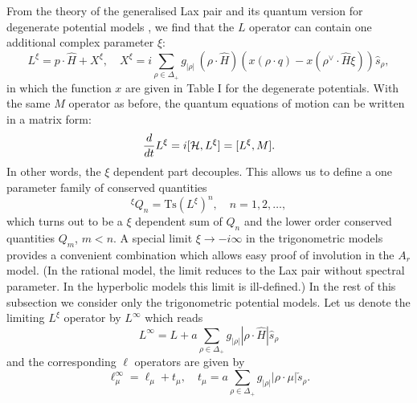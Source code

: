 \documentclass[a4paper,12pt]{article}
\begin{document}
From the theory of the generalised Lax pair \cite{bcs2} and its
quantum version for degenerate potential models \cite{bms}, we
find that the \(L\) operator can contain one additional complex
parameter \(\xi\):
\begin{equation}
   L^{\xi} = p\cdot\hat{H}+X^{\xi},\quad
   X^{\xi}=i\sum_{\rho\in\Delta_{+}}g_{|\rho|}
   \,(\rho\cdot\hat{H})\left(x(\rho\cdot
   q)-x(\rho^\vee\!\cdot\hat{H}\xi)\right)\hat{s}_{\rho},
   \label{LaxOpDefxi}
\end{equation}
in which the function \(x\) are given in Table I for the degenerate
potentials. With the same \(M\) operator as before, the quantum
equations of motion can be written in a matrix form:
\begin{equation}
   \label{LaxEquationxi}
   {d\over dt}{L^\xi}=i[{\cal H},L^\xi]=[L^\xi,{M}].
\end{equation}
In other words, the \(\xi\) dependent part decouples.
This allows us to define a one parameter family of conserved
quantities
\begin{equation}
   {}^{\xi}Q_n=\mbox{Ts}(L^{\xi})^n,\quad n=1,2,\ldots,
\end{equation}
which turns out to be a \(\xi\) dependent sum of \(Q_n\) and the
lower order conserved quantities \(Q_m\), \(m< n\).
A special limit \(\xi\to-i\infty\) in the trigonometric models
provides a convenient combination which allows easy proof of
involution in the \(A_r\) model.
(In the rational model, the limit reduces to the Lax pair without
spectral parameter. In the hyperbolic models this
limit is ill-defined.)
In the rest of this subsection we consider only the trigonometric
potential models.
Let us denote the limiting \(L^\xi\) operator by \(L^\infty\) which
reads
\begin{equation}
   L^\infty=L+a\sum_{\rho\in\Delta_+}g_{|\rho|}|\rho\cdot\hat{H}|
   \hat{s}_{\rho}
\end{equation}
and the corresponding \(\ell\) operators are given by
\begin{equation}
   \ell^\infty_\mu=\ell_\mu +t_\mu,\quad
   t_\mu=a\sum_{\rho\in\Delta_+}g_{|\rho|}|\rho\cdot\mu|
   \check{s}_{\rho}.
\end{equation}
\end{document}
